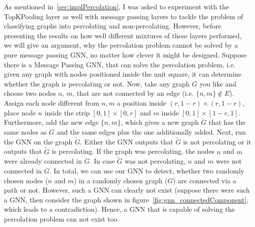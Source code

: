 As mentioned in~\ref{sec:implPercolation}, I was asked to experiment with the TopKPooling layer as well with message passing layers 
to tackle the problem of classifying graphs into percolating and non-percolating. 
However, before presenting the results on how well different mixtures of these layers performed, we will give an argument, why the percolation problem 
cannot be solved by a pure message passing GNN, no matter how clever it might be designed.
Suppose there is a Message Passing GNN, that can solve the percolation problem, i.e. given any graph 
with nodes positioned inside the unit square, it can determine whether the graph is percolating or not. 
Now, take any graph $G$ you like and choose two nodes $n$, $m$, that are not connected by an edge (i.e. $\{n,m\}\notin E$). 
Assign each node different from $n, m$ a position inside 
$(r, 1-r)\times(r, 1-r)$, place node $n$ inside the strip $[0,1]\times [0,r]$ and $m$ inside $[0,1]\times[1-r, 1]$. 
Furthermore, add the new edge $\{n,m\}$, which gives a new graph $\tilde{G}$ that has the same nodes
as $G$ and the same edges plus the one additionally added. Next, run the GNN on the graph $\tilde{G}$. 
Either the GNN outputs that $\tilde{G}$ is not percolating or it outputs that $\tilde{G}$ is percolating. 
If the graph was percolating, the nodes $n$ and $m$ were already connected in $G$. 
In case $\tilde{G}$ was not percolating, $n$ and $m$ were not connected in $G$. 
In total, we can use our GNN to detect, whether two randomly chosen nodes ($n$ and $m$) in a randomly 
chosen graph ($G$) are connected via a path or not.
However, such a GNN can clearly not exist (suppose there were such a GNN, 
then consider the graph shown in figure~\ref{fig:gnn_connectedComponent}, which leads to
a contradiction).
Hence, a GNN that is capable of solving the percolation problem can not exist too.
